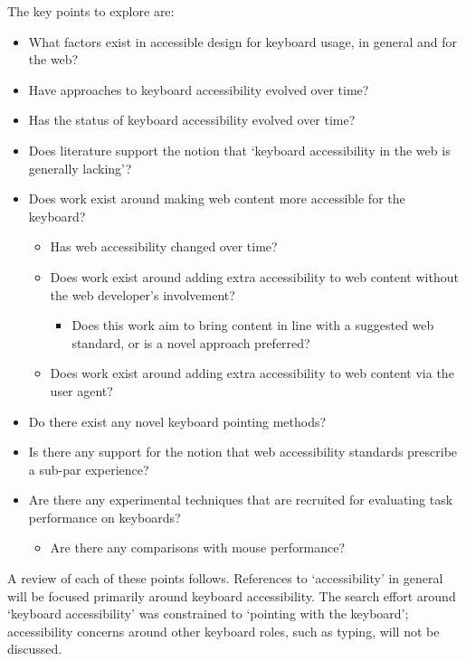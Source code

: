 \documentclass[a4paper, 11pt]{article}
\begin{document}
The key points to explore are:
\begin{itemize}
\item What factors exist in accessible design for keyboard usage, in general and for the web?
\item Have approaches to keyboard accessibility evolved over time?
\item Has the status of keyboard accessibility evolved over time?
\item Does literature support the notion that `keyboard accessibility in the web is generally lacking'?
\item Does work exist around making web content more accessible for the keyboard?
\begin{itemize}
\item Has web accessibility changed over time?
\item Does work exist around adding extra accessibility to web content without the web developer's involvement?
\begin{itemize}
\item Does this work aim to bring content in line with a suggested web standard, or is a novel approach preferred?
\end{itemize}
\item Does work exist around adding extra accessibility to web content via the user agent?
\end{itemize}
\item Do there exist any novel keyboard pointing methods?
\item Is there any support for the notion that web accessibility standards prescribe a sub-par experience?
\item Are there any experimental techniques that are recruited for evaluating task performance on keyboards?
\begin{itemize}
\item Are there any comparisons with mouse performance?
\end{itemize}
\end{itemize}

A review of each of these points follows. References to `accessibility' in general will be focused primarily around keyboard accessibility. The search effort around `keyboard accessibility' was constrained to `pointing with the keyboard'; accessibility concerns around other keyboard roles, such as typing, will not be discussed.
\end{document}
